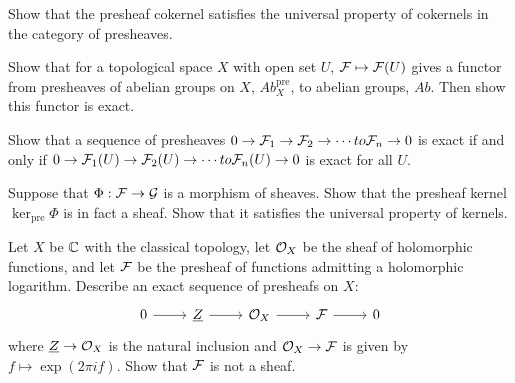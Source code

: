 \begin{exercise}
    Show that the presheaf cokernel satisfies the universal property of cokernels in the category of presheaves. 
\end{exercise}

\begin{exercise}
    Show that for a topological space $X$ with open set $U$, $\mathcal{F} \mapsto \mathcal{F}(U)$ gives a functor from presheaves of abelian groups on $X$, $Ab^{\text{pre}}_X$, to abelian groups, $Ab$. Then show this functor is exact. 
\end{exercise}

\begin{exercise}
    Show that a sequence of presheaves $0 \to \mathcal{F}_1 \to \mathcal{F}_2 \to \cdots to \mathcal{F}_n \to 0$ is exact if and only if $0 \to \mathcal{F}_1(U) \to \mathcal{F}_2(U) \to \cdots to \mathcal{F}_n(U) \to 0$ is exact for all $U$. 
\end{exercise}

\begin{exercise}
    Suppose that $\Phi: \mathcal{F} \to \mathcal{G}$ is a morphism of sheaves. Show that the presheaf kernel $\ker_{\text{pre}}\Phi$ is in fact a sheaf. Show that it satisfies the universal property of kernels. 
\end{exercise}

\begin{exercise}
    Let $X$ be $\mathbb{C}$ with the classical topology, let $\mathcal{O}_X$ be the sheaf of holomorphic functions, and let $\mathcal{F}$ be the presheaf of functions admitting a holomorphic logarithm. Describe an exact sequence of presheafs on $X$:  
    \[ \begin{tikzcd}
        0 \arrow[r] & \underline{Z} \arrow[r] & \cO_X \arrow[r] & \cF \arrow[r] & 0
    \end{tikzcd} \]
    where $\underline{Z} \to \mathcal{O}_X$ is the natural inclusion and $\mathcal{O}_X \to \mathcal{F}$ is given by $f \mapsto \exp(2 \pi i f)$. Show that $\mathcal{F}$ is not a sheaf. 
\end{exercise}